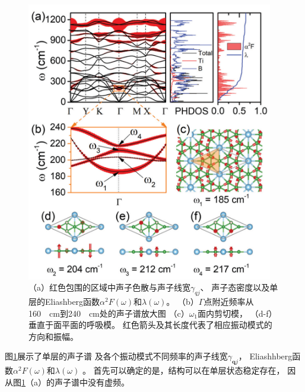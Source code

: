 \begin{figure}
  \includegraphics[width=0.96\textwidth]{figs/ch5_tib7_sc_all.png}
  \centering
  \caption{（a）红色包围的区域中声子色散与声子线宽$\gamma_{qj}$、
  声子态密度以及单层的Eliashberg函数$\alpha^2 F(\omega)$和$\lambda(\omega)$。
  （b）$\Gamma$点附近频率从\SI{160}{\per\cm}到\SI{240}{\per\cm}处的声子谱放大图
  （c）$\omega_1$面内剪切模，
  （d-f）垂直于面平面的呼吸模。
  红色箭头及其长度代表了相应振动模式的方向和振幅。}
  \label{fig:ch5_tib7_sc_all}
\end{figure}

图\ref{fig:ch5_tib7_sc_all}展示了单层的声子谱
及各个振动模式不同频率的声子线宽$\gamma_{\bm{q}j}$，
Eliashhberg函数$\alpha^2 F(\omega)$和$\lambda(\omega)$ 。
首先可以确定的是，结构可以在单层状态稳定存在，
因从图\ref{fig:ch5_tib7_sc_all}（a）的声子谱中没有虚频。

